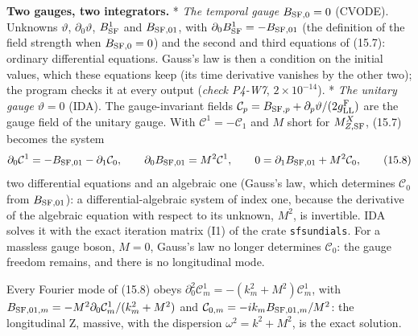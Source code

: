 \documentclass[
  10pt,
]{article}
\begin{document}
\textbf{Two gauges, two integrators.} * \emph{The temporal gauge}
\(B_{{\rm SF},0}=0\) (CVODE). Unknowns \(\vartheta\),
\(\partial_0\vartheta\), \(B^1_{\rm SF}\) and \(B_{{\rm SF},01}\), with
\(\partial_0B^1_{\rm SF}=-B_{{\rm SF},01}\) (the definition of the field
strength when \(B_{{\rm SF},0}=0\)) and the second and third equations
of (15.7): ordinary differential equations. Gauss's law is then a
condition on the initial values, which these equations keep (its time
derivative vanishes by the other two); the program checks it at every
output (\emph{check P4-W7}, \(2\times10^{-14}\)). * \emph{The unitary
gauge} \(\vartheta=0\) (IDA). The gauge-invariant fields
\(\mathcal C_p=B_{{\rm SF},p}+\partial_p\vartheta/(2g^{\rm F}_{\rm LL})\)
are the gauge field of the unitary gauge. With
\(\mathcal C^1=-\mathcal C_1\) and \(M\) short for \(M^X_{Z,{\rm SF}}\),
(15.7) becomes the system
\[\partial_0\mathcal C^1=-B_{{\rm SF},01}-\partial_1\mathcal C_0,\qquad\partial_0B_{{\rm SF},01}=M^2\mathcal C^1,\qquad0=\partial_1B_{{\rm SF},01}+M^2\mathcal C_0,\tag{15.8}\]
two differential equations and an algebraic one (Gauss's law, which
determines \(\mathcal C_0\) from \(B_{{\rm SF},01}\)): a
differential-algebraic system of index one, because the derivative of
the algebraic equation with respect to its unknown, \(M^2\), is
invertible. IDA solves it with the exact iteration matrix (I1) of the
crate \texttt{sfsundials}. For a massless gauge boson, \(M=0\), Gauss's
law no longer determines \(\mathcal C_0\): the gauge freedom remains,
and there is no longitudinal mode.

Every Fourier mode of (15.8) obeys
\(\partial_0^2\mathcal C^1_m=-(k_m^2+M^2)\mathcal C^1_m\), with
\(B_{{\rm SF},01,m}=-M^2\partial_0\mathcal C^1_m/(k_m^2+M^2)\) and
\(\mathcal C_{0,m}=-ik_mB_{{\rm SF},01,m}/M^2\): the longitudinal Z,
massive, with the dispersion \(\omega^2=k^2+M^2\), is the exact
solution.
\end{document}
